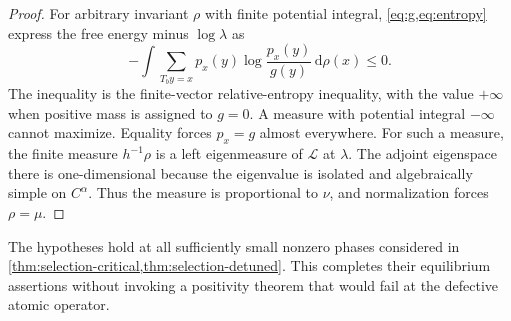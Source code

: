 \documentclass[11pt,a4paper]{article}
\numberwithin{equation}{section}
\theoremstyle{definition}
\theoremstyle{remark}
\newcommand{\dd}{\,\mathrm d}
\newcommand{\Lop}{\mathcal L}
\begin{document}
\begin{proof}
For arbitrary invariant $\rho$ with finite potential integral,
\cref{eq:g,eq:entropy} express the free energy minus $\log\lambda$ as
\begin{equation}
 -\int\sum_{T_by=x}p_x(y)\log\frac{p_x(y)}{g(y)}\dd\rho(x)\le0.
 \label{eq:relative-entropy}
\end{equation}
The inequality is the finite-vector relative-entropy inequality, with
the value $+\infty$ when positive mass is assigned to $g=0$.
A measure with potential integral $-\infty$ cannot maximize.
Equality forces $p_x=g$ almost everywhere. For such a measure, the finite
measure $h^{-1}\rho$ is a left eigenmeasure of $\Lop$ at $\lambda$.
The adjoint eigenspace there is one-dimensional because the eigenvalue
is isolated and algebraically simple on $C^\alpha$. Thus the measure is
proportional to $\nu$, and normalization forces $\rho=\mu$.
\end{proof}

The hypotheses hold at all sufficiently small nonzero phases considered
in \cref{thm:selection-critical,thm:selection-detuned}. This completes
their equilibrium assertions without invoking a positivity theorem that
would fail at the defective atomic operator.
\end{document}
